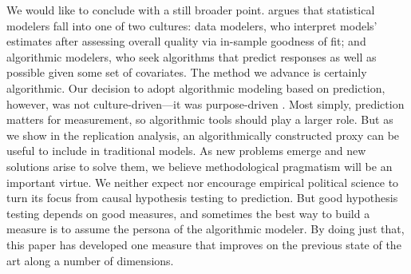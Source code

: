 We would like to conclude with a still broader point.
\citet{Breiman:2001fd} argues that statistical modelers fall into one of two cultures: data modelers, who interpret models' estimates after assessing overall quality via in-sample goodness of fit; and algorithmic modelers, who seek algorithms that predict responses as well as possible given some set of covariates.
The method we advance is certainly algorithmic.
Our decision to adopt algorithmic modeling based on prediction, however, was not culture-driven---it was purpose-driven \citep{clarke2012}.
Most simply, prediction matters for measurement, so algorithmic tools should play a larger role.
But as we show in the replication analysis, an algorithmically constructed proxy can be useful to include in traditional models.
As new problems emerge and new solutions arise to solve them, we believe methodological pragmatism will be an important virtue.
We neither expect nor encourage empirical political science to turn its focus from causal hypothesis testing to prediction.
But good hypothesis testing depends on good measures, and sometimes the best way to build a measure is to assume the persona of the algorithmic modeler.
By doing just that, this paper has developed one measure that improves on the previous state of the art along a number of dimensions.

